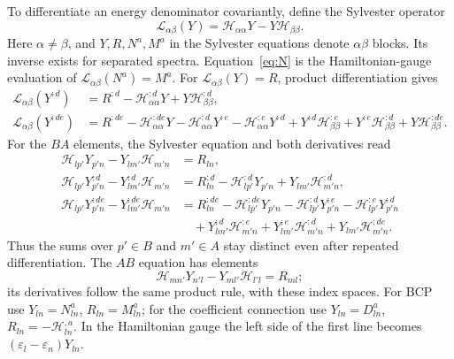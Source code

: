 \documentclass[prx,amsmath,amssymb,superscriptaddress,longbibliography]{revtex4-2}
\begin{document}
To differentiate an energy denominator covariantly, define the Sylvester operator
\begin{equation}
 \mathscr L_{\alpha\beta}(Y)=\mathcal H_{\alpha\alpha}Y-Y\mathcal H_{\beta\beta}.
 \label{eq:sylvester}
\end{equation}
Here $\alpha\ne\beta$, and $Y,R,N^a,M^a$ in the Sylvester equations denote
$\alpha\beta$ blocks. Its inverse exists for separated spectra. Equation~\eqref{eq:N} is the
Hamiltonian-gauge evaluation of $\mathscr L_{\alpha\beta}(N^a)=M^a$.
For $\mathscr L_{\alpha\beta}(Y)=R$, product differentiation gives
\begin{align}
 \mathscr L_{\alpha\beta}(Y^{:d})
 &=R^{:d}-\mathcal H_{\alpha\alpha}^{:d}Y+Y\mathcal H_{\beta\beta}^{:d},\label{eq:sylvester1}\\
 \mathscr L_{\alpha\beta}(Y^{:de})
 &=R^{:de}-\mathcal H_{\alpha\alpha}^{:de}Y
 -\mathcal H_{\alpha\alpha}^{:d}Y^{:e}-\mathcal H_{\alpha\alpha}^{:e}Y^{:d}
 +Y^{:d}\mathcal H_{\beta\beta}^{:e}+Y^{:e}\mathcal H_{\beta\beta}^{:d}
       +Y\mathcal H_{\beta\beta}^{:de}.
 \label{eq:sylvester2}
\end{align}
For the $BA$ elements, the Sylvester equation and both derivatives read
\begin{align}
 \mathcal H_{lp'}Y_{p'n}-Y_{lm'}\mathcal H_{m'n}&=R_{ln},\nonumber\\
 \mathcal H_{lp'}Y_{p'n}^{:d}-Y_{lm'}^{:d}\mathcal H_{m'n}
 &=R_{ln}^{:d}-\mathcal H_{lp'}^{:d}Y_{p'n}+Y_{lm'}\mathcal H_{m'n}^{:d},\nonumber\\
 \mathcal H_{lp'}Y_{p'n}^{:de}-Y_{lm'}^{:de}\mathcal H_{m'n}
 &=R_{ln}^{:de}-\mathcal H_{lp'}^{:de}Y_{p'n}
   -\mathcal H_{lp'}^{:d}Y_{p'n}^{:e}
   -\mathcal H_{lp'}^{:e}Y_{p'n}^{:d}\nonumber\\
 &\quad+Y_{lm'}^{:d}\mathcal H_{m'n}^{:e}
   +Y_{lm'}^{:e}\mathcal H_{m'n}^{:d}
   +Y_{lm'}\mathcal H_{m'n}^{:de}.
 \label{eq:sylvester-components}
\end{align}
Thus the sums over $p'\in B$ and $m'\in A$ stay distinct even after
repeated differentiation. The $AB$ equation has elements
\begin{equation}
 \mathcal H_{mn'}Y_{n'l}-Y_{ml'}\mathcal H_{l'l}=R_{ml};
 \label{eq:sylvester-ab-components}
\end{equation}
its derivatives follow the same product rule, with these index spaces.
For BCP use $Y_{ln}=N_{ln}^a$, $R_{ln}=M_{ln}^a$;
for the coefficient connection use $Y_{ln}=D_{ln}^a$,
$R_{ln}=-\mathcal H_{ln}^{,a}$.
In the Hamiltonian gauge the left side of the first line becomes
$(\varepsilon_l-\varepsilon_n)Y_{ln}$.
\end{document}
